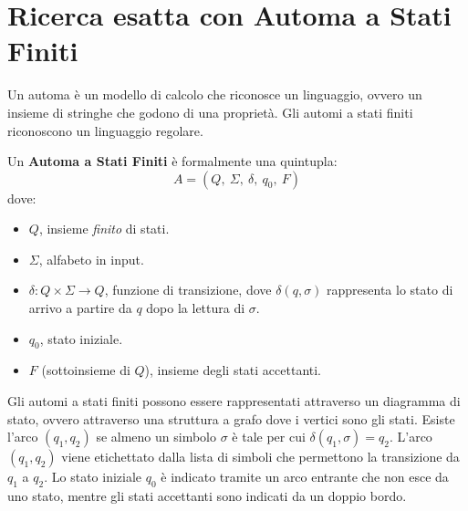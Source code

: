 \section{Ricerca esatta con Automa a Stati Finiti}
Un automa è un modello di calcolo che riconosce un linguaggio, ovvero un insieme
di stringhe che godono di una proprietà. Gli automi a stati finiti riconoscono
un linguaggio regolare.
\begin{definizione} 
    Un \textbf{Automa a Stati Finiti} è formalmente una quintupla:
    \begin{equation}
        A = (Q, \ \Sigma, \ \delta, \ q_0, \ F)
    \end{equation}
    dove:
    \begin{itemize}
        \item $Q$, insieme \textit{finito} di stati.
        \item $\Sigma$, alfabeto in input.
        \item $\delta: Q \times \Sigma \to Q$, funzione di transizione, dove
              $\delta(q,\sigma)$ rappresenta lo stato di arrivo a partire da $q$
              dopo la lettura di $\sigma$.
        \item $q_0$, stato iniziale.
        \item $F$ (sottoinsieme di $Q$), insieme degli stati accettanti.
    \end{itemize}
\end{definizione}
Gli automi a stati finiti possono essere rappresentati attraverso un diagramma di
stato, ovvero attraverso una struttura a grafo dove i vertici sono gli stati.
Esiste l'arco $(q_1, q_2)$ se almeno un simbolo $\sigma$ è tale per cui $\delta
    (q_1,\sigma) = q_2$. L'arco $(q_1, q_2)$ viene etichettato dalla lista di
simboli che permettono la transizione da $q_1$ a $q_2$. Lo stato iniziale $q_0$
è indicato tramite un arco entrante che non esce da uno stato, mentre gli stati
accettanti sono indicati da un doppio bordo.

